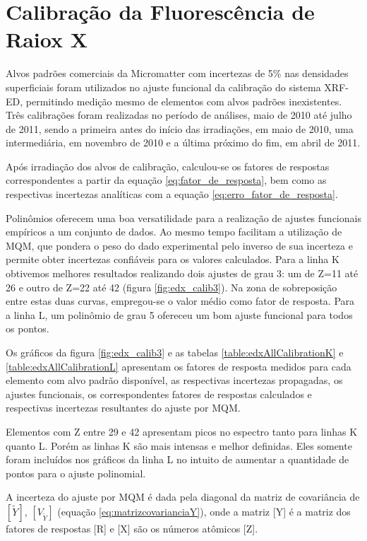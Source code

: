 \section{Calibração da Fluorescência de Raiox X}

Alvos padrões comerciais da Micromatter com incertezas de 5\% nas densidades 
superficiais foram utilizados no ajuste funcional da calibração do sistema XRF-ED, 
permitindo medição mesmo de elementos com alvos padrões inexistentes. Três
calibrações foram realizadas no período de análises, maio de 2010 até julho de 
2011, sendo a primeira antes do início das irradiações, em maio de 2010, 
uma intermediária, em novembro de 2010 e a última próximo do fim, em abril de 
2011.

Após irradiação dos alvos de calibração, calculou-se os fatores de respostas 
correspondentes a partir da equação \ref{eq:fator_de_resposta}, bem como as 
respectivas incertezas analíticas com a equação \ref{eq:erro_fator_de_resposta}.

Polinômios oferecem uma boa versatilidade para a realização de ajustes 
funcionais empíricos a um conjunto de dados. Ao mesmo tempo facilitam a 
utilização de MQM, que pondera o peso do dado experimental pelo inverso de sua 
incerteza e permite obter incertezas confiáveis para os valores calculados. 
Para a linha K obtivemos melhores resultados realizando dois ajustes de grau 3: 
um de Z=11 até 26 e outro de Z=22 até 42 (figura \ref{fig:edx_calib3}). 
Na zona de sobreposição entre estas duas curvas, empregou-se o valor médio como
fator de resposta. Para a linha L, um polinômio de grau 5 ofereceu um bom 
ajuste funcional para todos os pontos.

Os gráficos da figura \ref{fig:edx_calib3} e as tabelas \ref{table:edxAllCalibrationK} e 
\ref{table:edxAllCalibrationL} apresentam os fatores de resposta medidos para 
cada elemento com alvo padrão disponível, as respectivas incertezas propagadas,
os ajustes funcionais, os correspondentes fatores de respostas calculados e 
respectivas incertezas resultantes do ajuste por MQM.

Elementos com Z entre 29 e 42 apresentam picos no espectro tanto para linhas K 
quanto L. Porém as linhas K são mais intensas e melhor definidas. Eles somente 
foram incluídos nos gráficos da linha L no intuito de aumentar a quantidade de 
pontos para o ajuste polinomial.

A incerteza do ajuste por MQM é dada pela diagonal da matriz de covariância de 
$[\tilde{Y}]$, $[V_{\tilde{Y}}]$ (equação \ref{eq:matrizcovarianciaY}), onde 
a matriz [Y] é a matriz dos fatores de respostas [R] e [X] são os números 
atômicos [Z]. 

